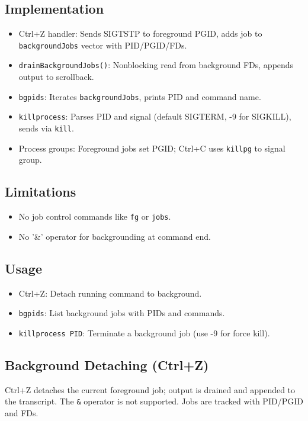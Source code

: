 \documentclass[11pt,a4paper]{article}
\begin{document}
\subsection{Implementation}
\begin{itemize}[leftmargin=*]
  \item Ctrl+Z handler: Sends SIGTSTP to foreground PGID, adds job to \texttt{backgroundJobs} vector with PID/PGID/FDs.
  \item \texttt{drainBackgroundJobs()}: Nonblocking read from background FDs, appends output to scrollback.
  \item \texttt{bgpids}: Iterates \texttt{backgroundJobs}, prints PID and command name.
  \item \texttt{killprocess}: Parses PID and signal (default SIGTERM, -9 for SIGKILL), sends via \texttt{kill}.
  \item Process groups: Foreground jobs set PGID; Ctrl+C uses \texttt{killpg} to signal group.
\end{itemize}

\subsection{Limitations}
\begin{itemize}[leftmargin=*]
  \item No job control commands like \texttt{fg} or \texttt{jobs}.
  \item No '\&' operator for backgrounding at command end.
\end{itemize}

\subsection{Usage}
\begin{itemize}[leftmargin=*]
  \item Ctrl+Z: Detach running command to background.
  \item \texttt{bgpids}: List background jobs with PIDs and commands.
  \item \texttt{killprocess PID}: Terminate a background job (use -9 for force kill).
\end{itemize}

\subsection{Background Detaching (Ctrl+Z)}
Ctrl+Z detaches the current foreground job; output is drained and appended to the transcript. The \texttt{\&} operator is not supported. Jobs are tracked with PID/PGID and FDs.
\end{document}

